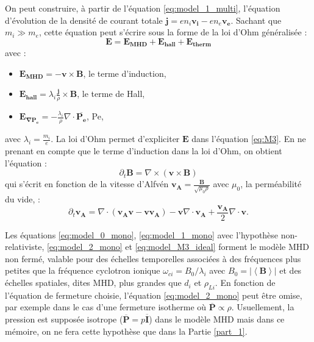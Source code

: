 On peut construire, à partir de l'équation \eqref{eq:model_1_multi}, l'équation d'évolution de la densité de courant totale $\boldsymbol{j} = e n_i \boldsymbol{v_i} - e n_e \boldsymbol{v_e}$. Sachant que $m_i \gg m_e$, cette équation peut s'écrire sous la forme de la loi d'Ohm généralisée : \begin{equation} 
\boldsymbol{E} =  \boldsymbol{E_{MHD}} +  \boldsymbol{E_{hall}} +  \boldsymbol{E_{therm}} \label{eq:ohm} 
\end{equation}
avec :
\begin{itemize}
 \item $\boldsymbol{E_{MHD}} =  - \boldsymbol{v} \times \boldsymbol{B}$, le terme d'induction,
 \item $\boldsymbol{E_{hall}} = \lambda_i \frac{\boldsymbol{j}}{\rho} \times \boldsymbol{B}$, le terme de \acl{Hall},
 \item $\boldsymbol{E_{\nabla P_e}} = - \frac{\lambda_i}{\rho} \nabla \cdot \overline{\boldsymbol{P_{e}}}$,  \acl{Pe},
\end{itemize}
avec $\lambda_i = \frac{m_i}{e}$. La loi d'Ohm permet d'expliciter $\boldsymbol{E}$ dans l'équation \eqref{eq:M3}. En ne prenant en compte que le terme d'induction dans la loi d'Ohm, on obtient l'équation : 
\begin{equation}
    \label{eq:model_M3_ideal} \partial_t \boldsymbol{B} = \nabla \times \left(\boldsymbol{v} \times \boldsymbol{B} \right)
\end{equation}
qui s'écrit en fonction de la vitesse d'Alfvén $\boldsymbol{v_A} = \frac{\boldsymbol{B}}{\sqrt{\mu_0 \rho}}$ avec $\mu_0$, la perméabilité du vide, : 
\begin{equation}
\label{eq:model_M3_idealvA} \partial_t \boldsymbol{v_A}  =   \nabla \cdot \left(\boldsymbol{v_A}\boldsymbol{v} - \boldsymbol{v}\boldsymbol{v_A}\right) -  \boldsymbol{v}  \nabla \cdot \boldsymbol{v_A} +  \frac{\boldsymbol{v_A}}{2}  \nabla \cdot \boldsymbol{v}. \end{equation}

Les équations \eqref{eq:model_0_mono}, \eqref{eq:model_1_mono} avec l'hypothèse non-relativiste, \eqref{eq:model_2_mono} et  \eqref{eq:model_M3_ideal} forment le modèle \ac{MHD} non fermé, valable pour des échelles temporelles associées à des fréquences plus petites que la fréquence cyclotron ionique $\omega_{ci} = B_0/\lambda_i$ avec $B_0 = |\left<\boldsymbol{B}\right>|$ et des échelles spatiales, dites \ac{MHD}, plus grandes que $d_i$ et $\rho_{Li}$. En fonction de l'équation de fermeture choisie, l'équation \eqref{eq:model_2_mono} peut être omise, par exemple dans le cas d'une fermeture isotherme où $\overline{\boldsymbol{P}} \propto \rho$.
Usuellement, la pression est supposée isotrope ($\overline{\boldsymbol{P}} = p \overline{\boldsymbol{I}}$) dans le modèle \acs{MHD} mais dans ce mémoire, on ne fera cette hypothèse que dans la Partie \ref{part_1}. 

